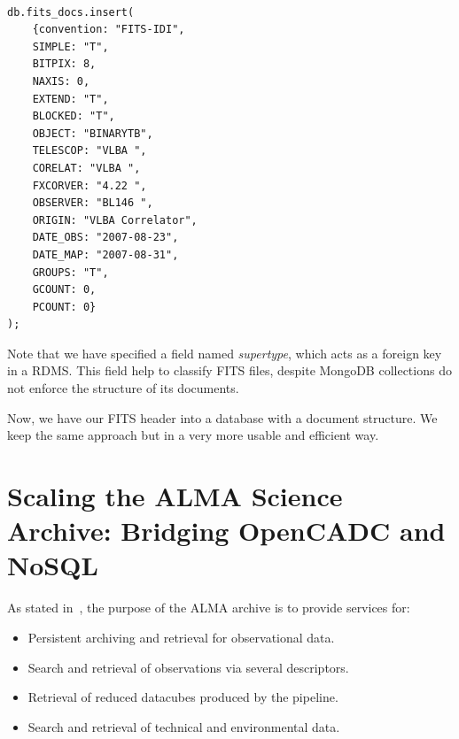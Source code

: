 \begin{lstlisting}[float,label=lst:fitsinsert,caption=MongoDB BSON code for adding FITS metadata to the NoSQL database.]

db.fits_docs.insert(
    {convention: "FITS-IDI",
    SIMPLE: "T",
    BITPIX: 8,
    NAXIS: 0,
    EXTEND: "T",
    BLOCKED: "T",
    OBJECT: "BINARYTB",
    TELESCOP: "VLBA ",
    CORELAT: "VLBA ",
    FXCORVER: "4.22 ",
    OBSERVER: "BL146 ",
    ORIGIN: "VLBA Correlator",
    DATE_OBS: "2007-08-23",
    DATE_MAP: "2007-08-31",
    GROUPS: "T",
    GCOUNT: 0,
    PCOUNT: 0}
);

\end{lstlisting}

Note that we have specified a field named \emph{supertype}, which acts as a foreign key in a RDMS. This field help to classify FITS files, despite MongoDB collections do not enforce the structure of its documents.

Now, we have our FITS header into a database with a document structure. We keep the same approach but in a very more usable and efficient way.




\section{Scaling the ALMA Science Archive: Bridging OpenCADC and NoSQL} %
\label{sec:rewriting_the_alma_science_archive_with_nosql}
 
As stated in~\cite{2009ASPC..404..324E}, the purpose of the ALMA archive is to provide services for:

\begin{itemize}

\item Persistent archiving and retrieval for observational data.

\item Search and retrieval of observations via several descriptors. %

\item Retrieval of reduced datacubes
produced by
the
pipeline.

\item Search and retrieval of technical and environmental data. %
\end{itemize}

